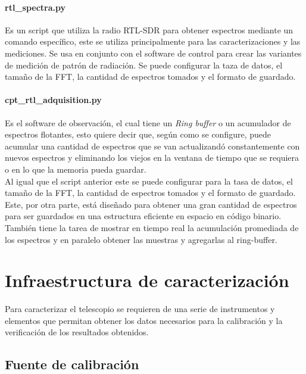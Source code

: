 \paragraph{rtl\_spectra.py} Es un script que utiliza la radio RTL-SDR para obtener espectros mediante un comando específico, este se utiliza principalmente para las caracterizaciones y las mediciones. Se usa en conjunto con el software de control para crear las variantes de medición de patrón de radiación. Se puede configurar la taza de datos, el tamaño de la FFT, la cantidad de espectros tomados y el formato de guardado.\\

\paragraph{cpt\_rtl\_adquisition.py} Es el software de observación, el cual tiene un \textit{Ring buffer} o un acumulador de espectros flotantes, esto quiere decir que, según como se configure, puede acumular una cantidad de espectros que se van actualizandó constantemente con nuevos espectros y eliminando los viejos en la ventana de tiempo que se requiera o en lo que la memoria pueda guardar.\\

Al igual que el script anterior este se puede configurar para la tasa de datos, el tamaño de la FFT, la cantidad de espectros tomados y el formato de guardado. Este, por otra parte, está diseñado para obtener una gran cantidad de espectros para ser guardados en una estructura eficiente en espacio en código binario. También tiene la tarea de mostrar en tiempo real la acumulación promediada de los espectros y en paralelo obtener las muestras y agregarlas al ring-buffer.\\


\section{Infraestructura de caracterización}

Para caracterizar el telescopio se requieren de una serie de instrumentos y elementos que permitan obtener los datos necesarios para la calibración y la verificación de los resultados obtenidos.\\

\subsection{Fuente de calibración}

